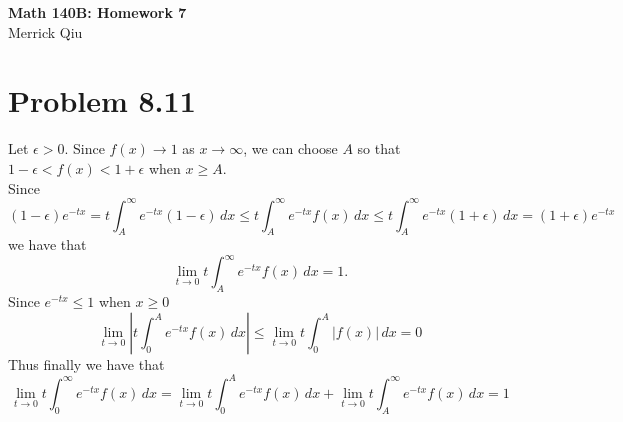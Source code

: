 \documentclass{article}
\begin{document}
\begin{center}
	\huge{\bf Math 140B: Homework 7} \\
	Merrick Qiu
\end{center}

\section*{Problem 8.11}
Let $\epsilon > 0$.
Since $f(x) \to 1$ as $x \to \infty$, we can choose $A$ so that $1-\epsilon < f(x) < 1+\epsilon$
when $x \geq A$. \\

Since
\[
  (1-\epsilon)e^{-tx} = t\int_A^\infty e^{-tx}(1-\epsilon) \,dx \leq 
  t\int_A^\infty e^{-tx}f(x) \,dx \leq 
  t\int_A^\infty e^{-tx}(1+\epsilon) \,dx = (1+\epsilon)e^{-tx}
\]
we have that 
\[
  \lim_{t\to 0} t\int_A^\infty e^{-tx}f(x) \,dx = 1.
\]
Since $e^{-tx} \leq 1$ when $x \geq 0$
\[
  \lim_{t\to 0} \left| t\int_0^A e^{-tx}f(x) \,dx\right| \leq 
  \lim_{t\to 0} t\int_0^A |f(x)|\,dx = 0
\]
Thus finally we have that
\[
  \lim_{t\to 0} t\int_0^\infty e^{-tx}f(x) \,dx = 
  \lim_{t\to 0} t\int_0^A e^{-tx}f(x) \,dx +
  \lim_{t\to 0} t\int_A^\infty e^{-tx}f(x) \,dx= 1
\]
\newpage 
\end{document}
